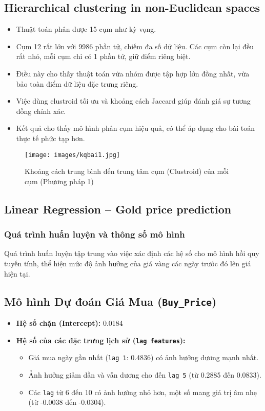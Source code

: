 \documentclass[conference]{IEEEtran}
\begin{document}
\subsection{Hierarchical clustering in non-Euclidean spaces}
\begin{itemize}
    \item Thuật toán phân được 15 cụm như kỳ vọng.
    \item Cụm 12 rất lớn với 9986 phần tử, chiếm đa số dữ liệu. Các cụm còn lại đều rất nhỏ, mỗi cụm chỉ có 1 phần tử, giữ điểm riêng biệt.
    \item Điều này cho thấy thuật toán vừa nhóm được tập hợp lớn đồng nhất, vừa bảo toàn điểm dữ liệu đặc trưng riêng.
    \item Việc dùng clustroid tối ưu và khoảng cách Jaccard giúp đánh giá sự tương đồng chính xác.
    \item Kết quả cho thấy mô hình phân cụm hiệu quả, có thể áp dụng cho bài toán thực tế phức tạp hơn.
\end{itemize}
\begin{figure}
    \centering
    \texttt{[image: images/kqbai1.jpg]}
    \caption{Khoảng cách trung bình đến trung tâm cụm (Clustroid) của mỗi cụm (Phương pháp 1)}
    \label{fig:enter-label}
\end{figure}
\subsection{Linear Regression – Gold price prediction}
\subsubsection{Quá trình huấn luyện và thông số mô hình}

Quá trình huấn luyện tập trung vào việc xác định các hệ số cho mô hình hồi quy tuyến tính, thể hiện mức độ ảnh hưởng của giá vàng các ngày trước đó lên giá hiện tại.

\subsection*{Mô hình Dự đoán Giá Mua (\texttt{Buy\_Price})}
\begin{itemize}
    \item \textbf{Hệ số chặn (Intercept):} 0.0184
    \item \textbf{Hệ số của các đặc trưng lịch sử (\texttt{lag features}):}
    \begin{itemize}
        \item Giá mua ngày gần nhất (\texttt{lag 1}: 0.4836) có ảnh hưởng dương mạnh nhất.
        \item Ảnh hưởng giảm dần và vẫn dương cho đến \texttt{lag 5} (từ 0.2885 đến 0.0833).
        \item Các \texttt{lag} từ 6 đến 10 có ảnh hưởng nhỏ hơn, một số mang giá trị âm nhẹ (từ -0.0038 đến -0.0304).
    \end{itemize}
\end{itemize}
\end{document}
